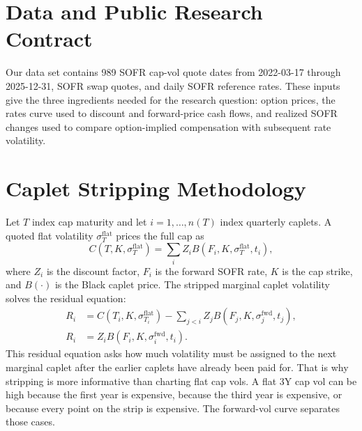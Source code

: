 \documentclass[12pt]{article}
\begin{document}
\section{Data and Public Research Contract}

Our data set contains 989 SOFR cap-vol quote dates from 2022-03-17 through 2025-12-31, SOFR swap quotes, and daily SOFR reference rates. These inputs give the three ingredients needed for the research question: option prices, the rates curve used to discount and forward-price cash flows, and realized SOFR changes used to compare option-implied compensation with subsequent rate volatility.

\begin{table}[H]
\centering
\scriptsize
\resizebox{\textwidth}{!}{}
\caption{Data coverage.}
\label{tab:data_overview}
\end{table}

\section{Caplet Stripping Methodology}

Let $T$ index cap maturity and let $i=1,\ldots,n(T)$ index quarterly caplets. A quoted flat volatility $\sigma_T^{\mathrm{flat}}$ prices the full cap as
\begin{equation}
C(T,K,\sigma_T^{\mathrm{flat}})=\sum_i Z_i B(F_i,K,\sigma_T^{\mathrm{flat}},t_i),
\end{equation}
where $Z_i$ is the discount factor, $F_i$ is the forward SOFR rate, $K$ is the cap strike, and $B(\cdot)$ is the Black caplet price. The stripped marginal caplet volatility solves the residual equation:
\begin{align}
R_i &= C(T_i,K,\sigma_{T_i}^{\mathrm{flat}})
      -\sum_{j<i} Z_jB(F_j,K,\sigma_j^{\mathrm{fwd}},t_j), \\
R_i &= Z_iB(F_i,K,\sigma_i^{\mathrm{fwd}},t_i).
\end{align}
This residual equation asks how much volatility must be assigned to the next marginal caplet after the earlier caplets have already been paid for. That is why stripping is more informative than charting flat cap vols. A flat 3Y cap vol can be high because the first year is expensive, because the third year is expensive, or because every point on the strip is expensive. The forward-vol curve separates those cases.
\end{document}
